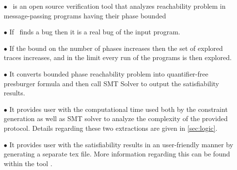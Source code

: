 

\begin{enumerate}
\item[$\bullet$] \MPass\ is an open source \cite{github.MPass}
  verification tool that analyzes reachability problem in message-passing programs having their phase bounded
\item[$\bullet$] If \MPass\ finds a bug then it is a real bug of the input program.

\item[$\bullet$] If the bound on the number of phases increases  then the set of explored traces increases, and in the limit every run of the programs is then explored.   
\item[$\bullet$] It converts bounded phase reachability problem into quantifier-free presburger formula and then call 
  SMT Solver to output the satisfiability results.
  
\item[$\bullet$] It provides user with the computational time used both by the constraint generation as well as 
  SMT solver to analyze the complexity of the provided protocol. Details regarding these two extractions are given in \cref{sec:logic}.
\item[$\bullet$] It provides user with the satisfiability results in an user-friendly manner by generating a separate tex file.
  More information regarding this can be found within the tool \cite{github.MPass}.
\end{enumerate}

